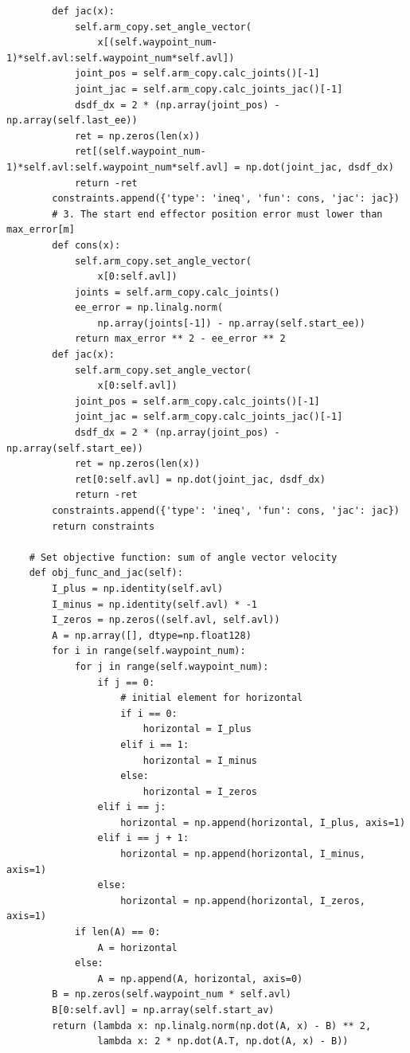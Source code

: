 \begin{verbatim}
        def jac(x):
            self.arm_copy.set_angle_vector(
                x[(self.waypoint_num-1)*self.avl:self.waypoint_num*self.avl])
            joint_pos = self.arm_copy.calc_joints()[-1]
            joint_jac = self.arm_copy.calc_joints_jac()[-1]
            dsdf_dx = 2 * (np.array(joint_pos) - np.array(self.last_ee))
            ret = np.zeros(len(x))
            ret[(self.waypoint_num-1)*self.avl:self.waypoint_num*self.avl] = np.dot(joint_jac, dsdf_dx)
            return -ret
        constraints.append({'type': 'ineq', 'fun': cons, 'jac': jac})
        # 3. The start end effector position error must lower than max_error[m]
        def cons(x):
            self.arm_copy.set_angle_vector(
                x[0:self.avl])
            joints = self.arm_copy.calc_joints()
            ee_error = np.linalg.norm(
                np.array(joints[-1]) - np.array(self.start_ee))
            return max_error ** 2 - ee_error ** 2
        def jac(x):
            self.arm_copy.set_angle_vector(
                x[0:self.avl])
            joint_pos = self.arm_copy.calc_joints()[-1]
            joint_jac = self.arm_copy.calc_joints_jac()[-1]
            dsdf_dx = 2 * (np.array(joint_pos) - np.array(self.start_ee))
            ret = np.zeros(len(x))
            ret[0:self.avl] = np.dot(joint_jac, dsdf_dx)
            return -ret
        constraints.append({'type': 'ineq', 'fun': cons, 'jac': jac})
        return constraints

    # Set objective function: sum of angle vector velocity
    def obj_func_and_jac(self):
        I_plus = np.identity(self.avl)
        I_minus = np.identity(self.avl) * -1
        I_zeros = np.zeros((self.avl, self.avl))
        A = np.array([], dtype=np.float128)
        for i in range(self.waypoint_num):
            for j in range(self.waypoint_num):
                if j == 0:
                    # initial element for horizontal
                    if i == 0:
                        horizontal = I_plus
                    elif i == 1:
                        horizontal = I_minus
                    else:
                        horizontal = I_zeros
                elif i == j:
                    horizontal = np.append(horizontal, I_plus, axis=1)
                elif i == j + 1:
                    horizontal = np.append(horizontal, I_minus, axis=1)
                else:
                    horizontal = np.append(horizontal, I_zeros, axis=1)
            if len(A) == 0:
                A = horizontal
            else:
                A = np.append(A, horizontal, axis=0)
        B = np.zeros(self.waypoint_num * self.avl)
        B[0:self.avl] = np.array(self.start_av)
        return (lambda x: np.linalg.norm(np.dot(A, x) - B) ** 2,
                lambda x: 2 * np.dot(A.T, np.dot(A, x) - B))


\end{verbatim}
